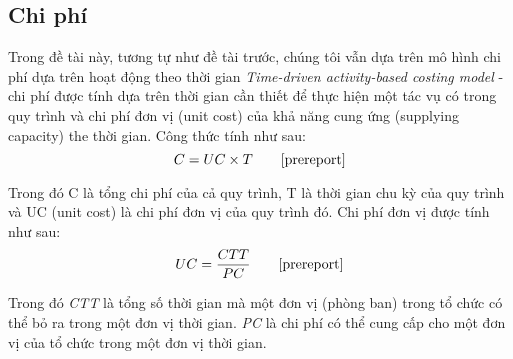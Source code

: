 \subsection{Chi phí}
Trong đề tài này, tương tự như đề tài trước, chúng tôi vẫn dựa trên mô hình chi phí dựa trên hoạt động theo thời gian \emph{Time-driven activity-based costing
model} - chi phí được tính dựa trên thời gian cần thiết để thực hiện một tác vụ có trong quy trình và chi phí đơn vị (unit cost) của khả năng cung ứng (supplying capacity) the thời gian. Công thức tính như sau:
\[ C = UC \times T \tag*{\cite{prereport}}\]
\par
Trong đó C là tổng chi phí của cả quy trình, T là thời gian chu kỳ của quy trình và UC (unit cost) là chi phí đơn vị của quy trình đó. Chi phí đơn vị được tính như sau:
\[ UC = \frac{CTT}{PC} \tag*{\cite{prereport}}\]
\par
Trong đó \emph{CTT} là tổng số thời gian mà một đơn vị (phòng ban) trong tổ chức có thể bỏ ra trong một đơn vị thời gian. \emph{PC} là chi phí có thể cung cấp cho một đơn vị của tổ chức trong một đơn vị thời gian.